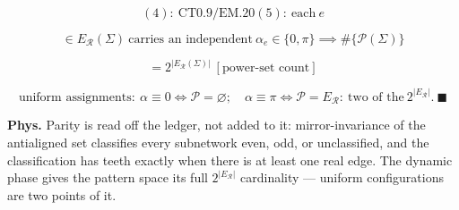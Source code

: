 \begin{theorem}
\[
(4):\ \mathrm{CT0.9}/\mathrm{EM.20}(5):\ \text{each}\ e
\]

\[
\in E_{\mathcal R}(\Sigma)\ \text{carries an independent}\ \alpha_e\in\{0,\pi\}\implies\#\{\mathcal P(\Sigma)\}
\]

\[
= 2^{|E_{\mathcal R}(\Sigma)|}\ [\text{power-set count}]
\]

\[
\text{uniform assignments}:\ \alpha\equiv0\iff\mathcal P=\varnothing;\quad\alpha\equiv\pi\iff\mathcal P=E_{\mathcal R}:\ \text{two of the}\ 2^{|E_{\mathcal R}|}.\ \blacksquare
\]

\textbf{Phys.} Parity is read off the ledger, not added to it: mirror-invariance of the antialigned set classifies every subnetwork even, odd, or unclassified, and the classification has teeth exactly when there is at least one real edge. The dynamic phase gives the pattern space its full $2^{|E_{\mathcal R}|}$ cardinality — uniform configurations are two points of it.

\end{theorem}


